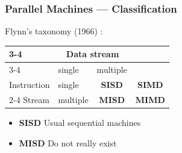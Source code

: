 \documentclass[xcolor={x11names,svgnames,psnames}]{beamer}
\begin{document}

\begin{frame}
\frametitle{Parallel Machines --- Classification}

\begin{block}{Flynn's taxonomy (1966) :}

  \begin{center}
    \begin{tabular}{|l|l|c|c|}
      \cline{3-4}
      \multicolumn{2}{c|}{}   & \multicolumn{2}{c|}{Data stream} \\
      \cline{3-4}
      \multicolumn{2}{c|}{}   & single & multiple \\
      \hline
      Instruction             & single   & \bf SISD   & \bf SIMD \\
      \cline{2-4}
      Stream                  & multiple   & \bf MISD   & \bf MIMD \\
      \hline
    \end{tabular}
  \end{center}
\end{block}

\pause
  \begin{itemize}

  \item {\bf SISD} Usual sequential machines

  \item {\bf MISD} Do not really exist
  \end{itemize}

\end{frame}
\end{document}
